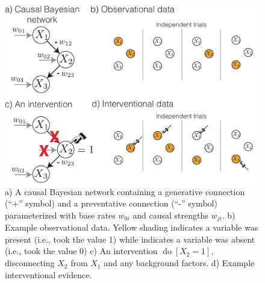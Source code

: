 \documentclass{cambridge7A}%
\newcommand{\ntodo}[2][]{\vspace{0.1cm} \hfil \todo[caption={\textbf{NB}}, size=\footnotesize, color = aliceblue, inline, #1]{#2}}
\DeclareMathOperator*{\Do}{do}
\newcommand{\ww}{\mathbf{w}} %
\newcommand{\cm}{a} %
\newcommand{\dm}{d} %
\newcommand{\ca}{\mathbf{a}} %
\newcommand{\da}{\mathbf{d}} %
\begin{document}



\begin{figure}[t]
   \centering
   \includegraphics[width = .7\columnwidth]{CBN}
   \caption{a) A causal Bayesian network containing a generative connection (``+'' symbol) and a preventative connection (``-'' symbol) parameterized with base rates $w_{0i}$ and causal strengths $w_{ji}$.  b) Example observational data.  Yellow shading indicates a variable was present (i.e., took the value 1) while indicates a variable was absent (i.e., took the value 0) c) An intervention $\Do[X_2 = 1]$, disconnecting $X_2$ from $X_1$ and any background factors. d) Example interventional evidence.%
   }
   \label{fig:CBN}
\end{figure}
\end{document}
